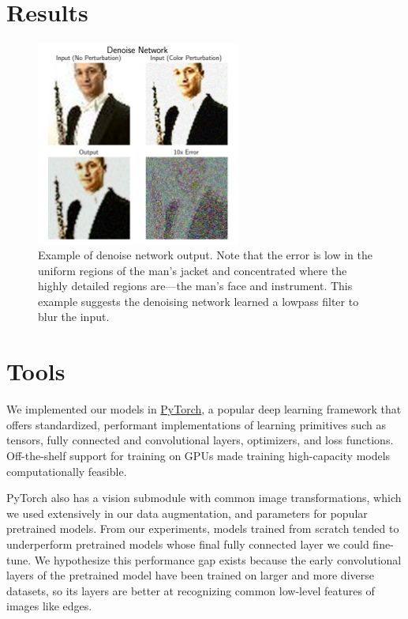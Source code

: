 \documentclass[justified]{article}
\begin{document}
  \section{Results}

  \begin{figure}[H]
    \centering
    \includegraphics[width=0.6\textwidth]{figures/denoise.png}
    \caption{
      Example of denoise network output.
      Note that the error is low in the uniform regions of the man's jacket and concentrated where the highly detailed regions are---the man's face and instrument.
      This example suggests the denoising network learned a lowpass filter to blur the input.
    }
  \end{figure}

  \section{Tools}

  We implemented our models in \href{https://pytorch.org/}{PyTorch}, a popular deep learning framework that offers standardized, performant implementations of learning primitives such as tensors, fully connected and convolutional layers, optimizers, and loss functions.
  Off-the-shelf support for training on GPUs made training high-capacity models computationally feasible.

  PyTorch also has a vision submodule with common image transformations, which we used extensively in our data augmentation, and parameters for popular pretrained models.
  From our experiments, models trained from scratch tended to underperform pretrained models whose final fully connected layer we could fine-tune.
  We hypothesize this performance gap exists because the early convolutional layers of the pretrained model have been trained on larger and more diverse datasets, so its layers are better at recognizing common low-level features of images like edges.
\end{document}
